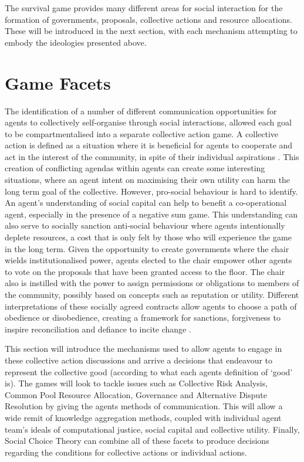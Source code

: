 The survival game provides many different areas for social interaction for the formation of governments, proposals, collective actions and resource allocations. These will be introduced in the next section, with each mechanism attempting to embody the ideologies presented above. 


\section{Game Facets}\label{sec: game facets}

The identification of a number of different communication opportunities for agents to collectively self-organise through social interactions, allowed each goal to be compartmentalised into a separate collective action game. A collective action is defined as a situation where it is beneficial for agents to cooperate and act in the interest of the community, in spite of their individual aspirations \cite{ober2008}. This creation of conflicting agendas within agents can create some interesting situations, where an agent intent on maximising their own utility can harm the long term goal of the collective. However, pro-social behaviour is hard to identify. An agent's understanding of social capital can help to benefit a co-operational agent, especially in the presence of a negative sum game. This understanding can also serve to socially sanction anti-social behaviour where agents intentionally deplete resources, a cost that is only felt by those who will experience the game in the long term. Given the opportunity to create governments where the chair wields institutionalised power, agents elected to the chair empower other agents to vote on the proposals that have been granted access to the floor. The chair also is instilled with the power to assign permissions or obligations to members of the community, possibly based on concepts such as reputation or utility. Different interpretations of these socially agreed contracts allow agents to choose a path of obedience or disobedience, creating a framework for sanctions, forgiveness to inspire reconciliation and defiance to incite change \cite{pitt}.

This section will introduce the mechanisms used to allow agents to engage in these collective action discussions and arrive a decisions that endeavour to represent the collective good (according to what each agents definition of `good' is). The games will look to tackle issues such as Collective Risk Analysis, Common Pool Resource Allocation, Governance and Alternative Dispute Resolution by giving the agents methods of communication. This will allow a wide remit of knowledge aggregation methods, coupled with individual agent team's ideals of computational justice, social capital and collective utility. Finally, Social Choice Theory can combine all of these facets to produce decisions regarding the conditions for collective actions or individual actions. 

